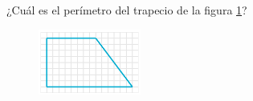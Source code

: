 
¿Cuál es el perímetro del trapecio de la figura \ref{fig:peri_trap_01}?
\begin{figure}[H]
    \begin{center}
        \includegraphics[width=0.3\textwidth]{../images/peri_trap_01.png}
    \end{center}
    \caption{}
    \label{fig:peri_trap_01}
\end{figure}